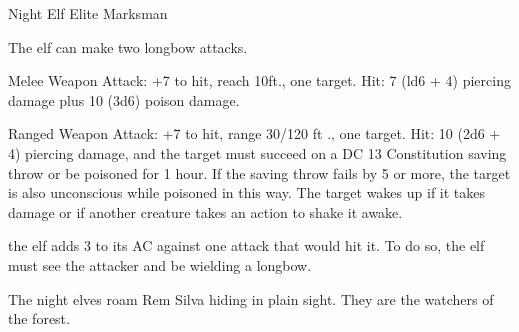 \begin{monsterbox}{Night Elf Elite Marksman}
	\begin{monsteraction}[Multiattack]
		The elf can make two longbow attacks.
	\end{monsteraction}
	\begin{monsteraction}[Shortsword]
		Melee Weapon Attack: +7 to hit, reach 10ft., one target. Hit: 7 (ld6 + 4) piercing damage plus 10 (3d6) poison damage.
	\end{monsteraction}
	\begin{monsteraction}[Longbow]
		Ranged Weapon Attack: +7 to hit, range 30/120 ft ., one target. Hit: 10 (2d6 + 4) piercing damage, and the target must succeed on a DC 13 Constitution saving throw or	be poisoned for 1 hour. If the saving throw fails by 5 or more,	the target is also unconscious while poisoned in this way. The target wakes up if it takes damage or if another creature takes an action to shake it awake.
	\end{monsteraction}
	\begin{monsteraction}
		the elf adds 3 to its AC against one attack that would hit it. To do so, the elf must see the attacker and be
		wielding a longbow.
	\end{monsteraction}
	The night elves roam Rem Silva hiding in plain sight. They are the watchers of the forest. 
\end{monsterbox}

%		
%	
%		

